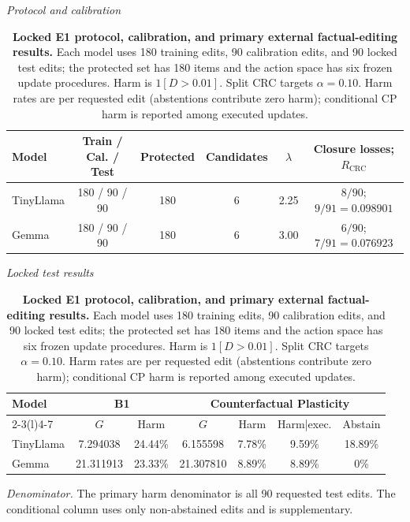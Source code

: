 
\begin{table}[ht]
\centering
\caption{\textbf{Locked E1 protocol, calibration, and primary external factual-editing results.}
Each model uses 180 training edits, 90 calibration edits, and 90 locked test edits; the protected set has 180 items and the action space has six frozen update procedures. Harm is $1[D>0.01]$. Split CRC targets $\alpha=0.10$. Harm rates are per requested edit (abstentions contribute zero harm); conditional CP harm is reported among executed updates.}
\label{tab:e1-primary-results}

\small
\begin{threeparttable}
\textit{Protocol and calibration}\\[-2pt]
\begin{tabular}{lccccc}
\toprule
Model & Train / Cal. / Test & Protected & Candidates & $\lambda$ & Closure losses; $R_{\mathrm{CRC}}$ \\
\midrule
TinyLlama & 180 / 90 / 90 & 180 & 6 & 2.25 & $8/90$; $9/91=0.098901$ \\
Gemma     & 180 / 90 / 90 & 180 & 6 & 3.00 & $6/90$; $7/91=0.076923$ \\
\bottomrule
\end{tabular}

\textit{Locked test results}\\[-2pt]
\begin{tabular}{lcccccc}
\toprule
Model & \multicolumn{2}{c}{B1} & \multicolumn{4}{c}{Counterfactual Plasticity} \\
\cmidrule(lr){2-3}\cmidrule(l){4-7}
& $G$ & Harm & $G$ & Harm & Harm|exec. & Abstain \\
\midrule
TinyLlama & 7.294038 & 24.44\% & 6.155598 & 7.78\% & 9.59\% & 18.89\% \\
Gemma     & 21.311913 & 23.33\% & 21.307810 & 8.89\% & 8.89\% & 0\% \\
\bottomrule
\end{tabular}

\begin{tablenotes}[flushleft]\footnotesize
\item \textit{Denominator.} The primary harm denominator is all 90 requested test edits. The conditional column uses only non-abstained edits and is supplementary.
\end{tablenotes}
\end{threeparttable}
\end{table}
